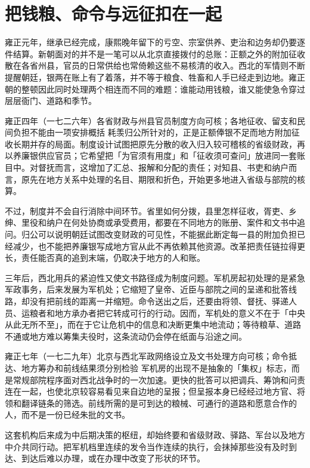 \section{把钱粮、命令与远征扣在一起}

雍正元年，继承已经完成，康熙晚年留下的亏空、宗室供养、吏治和边务却仍要逐件结算。新朝面对的并不是一笔可以从北京直接拨付的总账：正额之外的附加征收散在各省州县，官员的日常供给也常倚赖这些不易核清的收入。西北的军情则不断提醒朝廷，银两在账上有了着落，并不等于粮食、牲畜和人手已经走到边地。雍正朝的整顿因此同时处理两个相连而不同的难题：谁能动用钱粮，谁又能使急令穿过层层衙门、道路和季节。

\begin{event}{}{雍正四年（一七二六年）}{各省财政与州县官员}{制度方向可核；各地征收、留支和民间负担不能由一项安排概括}
耗羡归公所针对的，正是正额俸银不足而地方附加征收长期并存的局面。制度设计试图把原先分散的收入归入较可稽核的省级财政，再以养廉银供应官员；它希望把「为官须有用度」和「征收须可查问」放进同一套账目中。对督抚而言，这增加了汇总、报解和分配的责任；对知县、书吏和纳户而言，原先在地方关系中处理的名目、期限和折色，开始更多地进入省级与部院的核算。

不过，制度并不会自行消除中间环节。省里如何分拨，县里怎样征收，胥吏、乡绅、里役和纳户在何处协商或承受费用，都要在不同地方的账册、案件和文书中追问。归公可以说明朝廷试图改变财政的可见性，不能据此断定每一县的附加负担已经减少，也不能把养廉银写成地方官从此不再依赖其他资源。改革把责任链拉得更长，责任能否真的追到末端，仍取决于地方的人和账。
\end{event}

三年后，西北用兵的紧迫性又使文书路径成为制度问题。军机房起初处理的是紧急军政事务，后来发展为军机处；它缩短了皇帝、近臣与部院之间的呈递和批答线路，却没有把前线的距离一并缩短。命令送出之后，还要由将领、督抚、驿递人员、运粮者和地方承办者把它转成可行的行动。因而，军机处的意义不在于「中央从此无所不至」，而在于它让危机中的信息和决断更集中地流动；等待粮草、道路不通或地方难以筹集夫役时，这条流动仍会停在纸面与沿途之间。

\begin{event}{}{雍正七年（一七二九年）}{北京与西北军政网络}{设立及文书处理方向可核；命令抵达、地方筹办和前线结果须分别检验}
军机房的出现不是抽象的「集权」标志，而是常规部院程序面对西北战争时的一次加速。更快的批答可以把调兵、筹饷和问责连在一起，也使北京较容易看见来自边地的呈报；但呈报本身已经经过地方官、将领和翻译链条的筛选。前线所需的是可到达的粮械、可通行的道路和愿意合作的人，而不是一份已经朱批的文书。

这套机构后来成为中后期决策的枢纽，却始终要和省级财政、驿路、军台以及地方中介共同行动。把军机档里连续的发令当作连续的执行，会抹掉那些没有及时到达、到达后难以办理，或在办理中改变了形状的环节。
\end{event}

